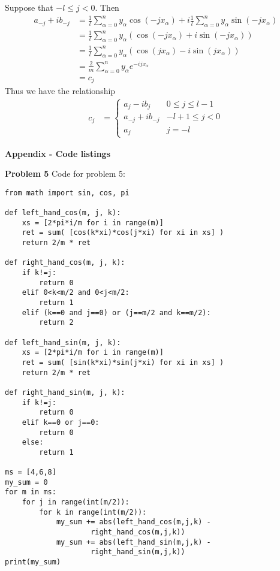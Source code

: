 \documentclass[12pt]{article}
\newcommand{\problem}[1]{\hspace{-4 ex} \large \textbf{Problem #1} }
\begin{document}
Suppose that $-l \leq j < 0$. Then
\begin{align*}
a_{-j} + ib_{-j} & = \frac{1}{l} \sum\limits_{\alpha=0}^{n} y_\alpha \cos(-j x_\alpha) + i \frac{1}{l}\sum\limits_{\alpha=0}^{n} y_\alpha \sin(-j x_\alpha) \\
& = \frac{1}{l} \sum\limits_{\alpha=0}^{n} y_\alpha \left( \cos(-j x_\alpha) + i\sin(-j x_\alpha) \right) \\
& = \frac{1}{l} \sum\limits_{\alpha=0}^{n} y_\alpha \left( \cos(j x_\alpha) - i\sin(j x_\alpha) \right) \\
& = \frac{2}{m} \sum\limits_{\alpha=0}^{n} y_\alpha e^{-ijx_\alpha} \\
& = c_j
\end{align*}
Thus we have the relationship 
\begin{align*}
	c_j &= \begin{cases}
		a_j - ib_j & 0\leq j \leq l-1 \\
		a_{-j} + ib_{-j} & -l+1 \leq j < 0 \\
		a_{j} & j=-l
	\end{cases}
\end{align*}

{\hspace{-4 ex} \large \textbf{Appendix - Code listings}}\bigbreak

\problem{5} Code for problem 5:
\begin{lstlisting}
from math import sin, cos, pi

def left_hand_cos(m, j, k):
	xs = [2*pi*i/m for i in range(m)]
	ret = sum( [cos(k*xi)*cos(j*xi) for xi in xs] )
	return 2/m * ret

def right_hand_cos(m, j, k):
	if k!=j:
		return 0
	elif 0<k<m/2 and 0<j<m/2:
		return 1
	elif (k==0 and j==0) or (j==m/2 and k==m/2):
		return 2	

def left_hand_sin(m, j, k):
	xs = [2*pi*i/m for i in range(m)]
	ret = sum( [sin(k*xi)*sin(j*xi) for xi in xs] )
	return 2/m * ret

def right_hand_sin(m, j, k):
	if k!=j:
		return 0
	elif k==0 or j==0:
		return 0
	else:
		return 1
		
ms = [4,6,8]
my_sum = 0
for m in ms:
	for j in range(int(m/2)):
		for k in range(int(m/2)):
			my_sum += abs(left_hand_cos(m,j,k) - 
					right_hand_cos(m,j,k))
			my_sum += abs(left_hand_sin(m,j,k) -
					right_hand_sin(m,j,k))
print(my_sum)
\end{lstlisting}
\end{document}
